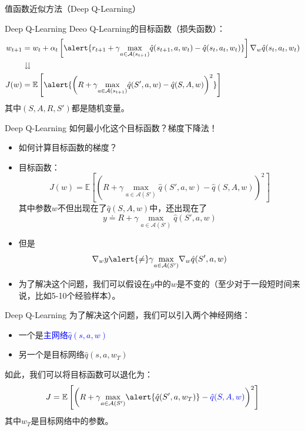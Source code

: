 \begin{section}{值函数近似方法\alert{（Deep Q-Learning）}}
\begin{frame}{Deep Q-Learning}
    Deeo Q-Learning的目标函数（损失函数）：
    \[
        \begin{aligned}
            w_{t+1}&=w_t+\alpha_t\left[\alert{r_{t+1}+\gamma \underset{a\in \mathcal{A}(s_{t+1})}{\max}\hat{q}(s_{t+1},a,w_t)-\hat{q}(s_t,a_t,w_t)}\right]\nabla_w\hat{q}(s_t,a_t,w_t)\\
            &\downdownarrows \\
            J(w)&=\mathbb{E}\left[\alert{\left(R+\gamma \underset{a\in \mathcal{A}(s_{t+1})}{\max}\hat{q}(S',a,w)-\hat{q}(S,A,w)\right)^2}\right]\\
        \end{aligned}
    \]
    其中$(S,A,R,S')$都是随机变量。
\end{frame}

\begin{frame}{Deep Q-Learning}
    如何最小化这个目标函数？梯度下降法！
    \begin{itemize}
        \item 如何计算目标函数的梯度？
        \item 目标函数：
        \[
            J(w)=\mathbb{E}\left[\left(R+\gamma \underset{a\in \mathcal{A}(S')}{\max}\hat{q}(S',a,w)-\hat{q}(S,A,w)\right)^2\right]
        \]
        其中参数$w$不但出现在了$\hat{q}(S,A,w)$中，还出现在了
        \[
            y\doteq R+\gamma\underset{a\in \mathcal{A}(S')}{\max}\hat{q}(S',a,w)
        \]
        \item 但是
        \[
            \nabla_wy\alert{\neq} \gamma\underset{a\in \mathcal{A}(S')}{\max}\nabla_w\hat{q}(S',a,w)
        \]
        \item 为了解决这个问题，我们可以假设在$y$中的$w$是不变的（至少对于一段短时间来说，比如5-10个经验样本）。
    \end{itemize}
\end{frame}

\begin{frame}{Deep Q-Learning}
    为了解决这个问题，我们可以引入两个神经网络：
    \begin{itemize}
        \item 一个是\textcolor{blue}{主网络$\hat{q}(s,a,w)$}
        \item 另一个是\alert{目标网络$\hat{q}(s,a,w_T)$}
    \end{itemize}
    如此，我们可以将目标函数可以退化为：
    \[
        J=\mathbb{E}\left[\left(R+\gamma \underset{a\in \mathcal{A}(S')}{\max}\alert{\hat{q}(S',a,w_T)}-\textcolor{blue}{\hat{q}(S,A,w)}\right)^2\right]
    \]
    其中$w_T$是目标网络中的参数。


\end{frame}
\end{section}
